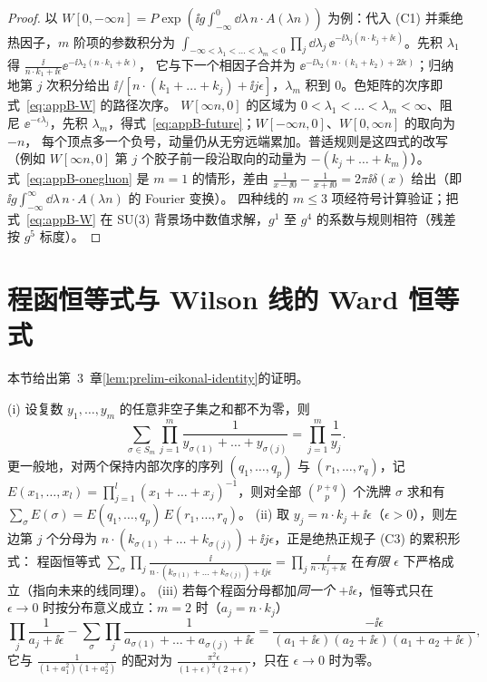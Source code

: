 \begin{proof}
以 $W[0,-\infty n]=P\exp(\ii g\int_{-\infty}^0\dd\lambda\,n\cdot A(\lambda n))$ 为例：代入 (C1) 并乘绝热因子，$m$ 阶项的参数积分为
$\int_{-\infty<\lambda_1<\dots<\lambda_m<0}\prod_j\dd\lambda_j\,\ee^{-\ii\lambda_j(n\cdot k_j+\ii\epsilon)}$。先积 $\lambda_1$ 得 $\frac{\ii}{n\cdot k_1+\ii\epsilon}\ee^{-\ii\lambda_2(n\cdot k_1+\ii\epsilon)}$，
它与下一个相因子合并为 $\ee^{-\ii\lambda_2(n\cdot(k_1+k_2)+2\ii\epsilon)}$；归纳地第 $j$ 次积分给出 $\ii/[n\cdot(k_1+\dots+k_j)+\ii j\epsilon]$，$\lambda_m$ 积到 $0$。色矩阵的次序即式~\eqref{eq:appB-W} 的路径次序。
$W[\infty n,0]$ 的区域为 $0<\lambda_1<\dots<\lambda_m<\infty$、阻尼 $\ee^{-\epsilon\lambda_j}$，先积 $\lambda_m$，得式~\eqref{eq:appB-future}；$W[-\infty n,0]$、$W[0,\infty n]$ 的取向为 $-n$，
每个顶点多一个负号，动量仍从无穷远端累加。普适规则是这四式的改写（例如 $W[\infty n,0]$ 第 $j$ 个胶子前一段沿取向的动量为 $-(k_j+\dots+k_m)$）。
式~\eqref{eq:appB-onegluon} 是 $m=1$ 的情形，差由 $\frac1{x-\ii0}-\frac1{x+\ii0}=2\pi\ii\delta(x)$ 给出（即 $\ii g\int_{-\infty}^\infty\dd\lambda\,n\cdot A(\lambda n)$ 的 Fourier 变换）。
四种线的 $m\le3$ 项经符号计算验证；把式~\eqref{eq:appB-W} 在 SU(3) 背景场中数值求解，$g^1$ 至 $g^4$ 的系数与规则相符（残差按 $g^5$ 标度）。%
\end{proof}
\section{程函恒等式与 Wilson 线的 Ward 恒等式}\label{sec:appB-eikonal}

本节给出第~3~章\cref{lem:prelim-eikonal-identity}的证明。

\begin{lemma}\label{lem:appB-shuffle}
(i) 设复数 $y_1,\dots,y_m$ 的任意非空子集之和都不为零，则
\begin{equation}\label{eq:appB-shuffle}
\sum_{\sigma\in S_m}\prod_{j=1}^m\frac{1}{y_{\sigma(1)}+\dots+y_{\sigma(j)}}=\prod_{j=1}^m\frac1{y_j}.
\end{equation}
更一般地，对两个保持内部次序的序列 $(q_1,\dots,q_p)$ 与 $(r_1,\dots,r_q)$，记 $E(x_1,\dots,x_l)=\prod_{j=1}^l(x_1+\dots+x_j)^{-1}$，则对全部 $\binom{p+q}{p}$ 个洗牌 $\sigma$ 求和有
$\sum_\sigma E(\sigma)=E(q_1,\dots,q_p)\,E(r_1,\dots,r_q)$。
(ii) 取 $y_j=n\cdot k_j+\ii\epsilon$（$\epsilon>0$），则左边第 $j$ 个分母为 $n\cdot(k_{\sigma(1)}+\dots+k_{\sigma(j)})+\ii j\epsilon$，正是绝热正规子 (C3) 的累积形式：
程函恒等式 $\sum_\sigma\prod_j\frac{\ii}{n\cdot(k_{\sigma(1)}+\dots+k_{\sigma(j)})+\ii j\epsilon}=\prod_j\frac{\ii}{n\cdot k_j+\ii\epsilon}$ 在\emph{有限} $\epsilon$ 下严格成立（指向未来的线同理）。
(iii) 若每个程函分母都加\emph{同一个} $+\ii\epsilon$，恒等式只在 $\epsilon\to0$ 时按分布意义成立：$m=2$ 时（$a_j=n\cdot k_j$）
\[
\prod_j\frac{1}{a_j+\ii\epsilon}-\sum_\sigma\prod_j\frac{1}{a_{\sigma(1)}+\dots+a_{\sigma(j)}+\ii\epsilon}=\frac{-\ii\epsilon}{(a_1+\ii\epsilon)(a_2+\ii\epsilon)(a_1+a_2+\ii\epsilon)},
\]
它与 $\frac1{(1+a_1^2)(1+a_2^2)}$ 的配对为 $\frac{\pi^2\epsilon}{(1+\epsilon)^2(2+\epsilon)}$，只在 $\epsilon\to0$ 时为零。
\end{lemma}

